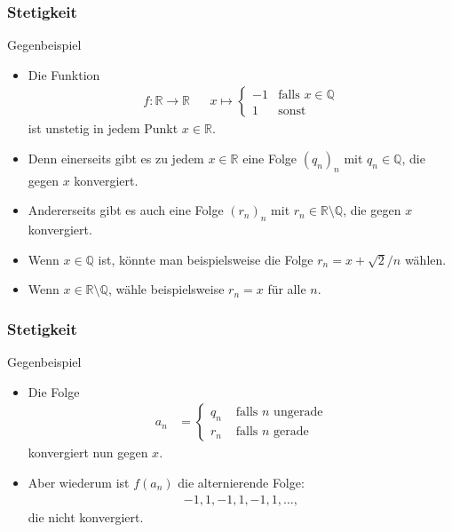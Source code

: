 \documentclass{beamer}
\newcommand\QQ{\mathbb Q}
\newcommand\RR{\mathbb R}
\renewcommand{\ae}{\"a}
\renewcommand{\oe}{\"o}
\newcommand{\ue}{\"u}
\newcommand{\mytitle}{Stetigkeit}
\begin{document}
\begin{frame}\frametitle{\mytitle}
	\begin{block}{Gegenbeispiel}
	\begin{itemize}
	\item Die Funktion
		\begin{align*}
			f:\RR\to\RR&&x\mapsto\begin{cases}-1&\mbox{falls }x\in\QQ\\1&\mbox{sonst}\end{cases}
		\end{align*}
		ist unstetig in jedem Punkt $x\in\RR$.
	\item Denn einerseits gibt es zu jedem $x\in\RR$ eine Folge $(q_n)_n$ mit $q_n\in\QQ$, die gegen $x$ konvergiert.
	\item Andererseits gibt es auch eine Folge $(r_n)_n$ mit $r_n\in\RR\setminus\QQ$, die gegen $x$ konvergiert.
	\item Wenn $x\in\QQ$ ist, k\oe nnte man beispielsweise die Folge
		$ r_n=x+\sqrt 2/n $ w\ae hlen.
	\item Wenn $x\in\RR\setminus\QQ$, w\ae hle beispielsweise $r_n=x$ f\ue r alle $n$.
	\end{itemize}	
	\end{block}
\end{frame}

\begin{frame}\frametitle{\mytitle}
	\begin{block}{Gegenbeispiel}
	\begin{itemize}
		\item Die Folge
			\begin{align*}
				a_n&=\begin{cases}
					q_n&\mbox{ falls $n$ ungerade}\\
					r_n&\mbox{ falls $n$ gerade}
				\end{cases}
			\end{align*}
			konvergiert nun gegen $x$.
		\item Aber wiederum ist $f(a_n)$ die alternierende Folge:
			\begin{align*}
			-1,1,-1,1,-1,1,\ldots,
			\end{align*}
			die nicht konvergiert.
	\end{itemize}	
	\end{block}
\end{frame}
\end{document}
